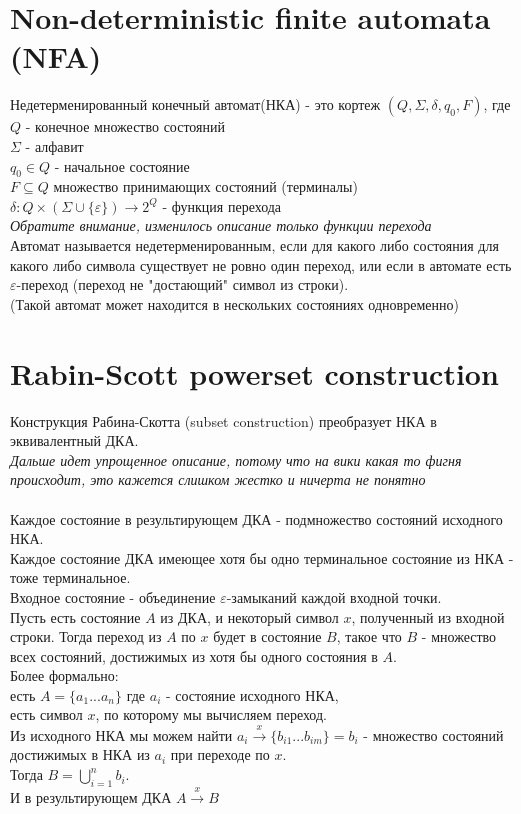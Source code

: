 \documentclass{article}
\begin{document}
	\section{Non-deterministic finite automata (NFA)}
	Недетерменированный конечный автомат(НКА) - это кортеж $(Q, \Sigma, \delta, q_0, F)$, где\\
	$Q$ - конечное множество состояний\\
	$\Sigma$ - алфавит\\
	$q_0\in Q$ - начальное состояние\\
	$F\subseteq Q$ множество принимающих состояний (терминалы)\\
	$\delta\colon Q\times(\Sigma\cup\{\varepsilon\})\to 2^Q$ - функция перехода\\
	\textit{Обратите внимание, изменилось описание только функции перехода}
	\noindent\\
	
	Автомат называется недетерменированным, если для какого либо состояния для какого либо символа существует не ровно один переход, или если в автомате есть $\varepsilon$-переход (переход не "достающий" символ из строки).\\
	(Такой автомат может находится в нескольких состояниях одновременно)
	
	\section{Rabin-Scott powerset construction}
	Конструкция Рабина-Скотта (subset construction) преобразует НКА в эквивалентный ДКА.\\
	\textit{Дальше идет упрощенное описание, потому что на вики какая то фигня происходит, это кажется слишком жестко и ничерта не понятно}\\
	\\
	Каждое состояние в результирующем ДКА - подмножество состояний исходного НКА.\\
	Каждое состояние ДКА имеющее хотя бы одно терминальное состояние из НКА - тоже терминальное.\\
	Входное состояние - объединение $\varepsilon$-замыканий каждой входной точки.\\ 
	Пусть есть состояние $A$ из ДКА, и некоторый символ $x$, полученный из входной строки.
	Тогда переход из $A$ по $x$ будет в состояние $B$, такое что $B$ - множество всех состояний, достижимых из хотя бы одного состояния в $A$.\\
	Более формально:\\ 
	есть $A = \{a_1 ... a_n\}$ где $a_i$ - состояние исходного НКА,\\
	есть символ $x$, по которому мы вычисляем переход.\\
	Из исходного НКА мы можем найти $a_i \xrightarrow{x} \{b_{i1} ... b_{im}\} = b_i$ - множество состояний достижимых в НКА из $a_i$ при переходе по $x$.\\
	Тогда $B = \bigcup^{n}_{i=1} b_i$.\\
	И в результирующем ДКА $A \xrightarrow{x} B$
		
\end{document}
